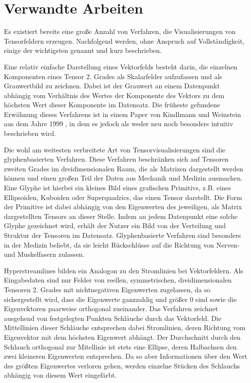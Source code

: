 \documentclass[a4paper,fontsize=12pt,toc=bib,halfparskip]{scrartcl}
\begin{document}
\section{Verwandte Arbeiten}
\label{sec:Verwandte}
Es existiert bereits eine gro{\ss}e Anzahl von Verfahren, die Visualisierungen von Tensorfeldern erzeugen. Nachfolgend werden, ohne Anspruch auf Vollst\"andigkeit, einige der wichtigsten genannt und kurz beschrieben.

Eine relativ einfache Darstellung eines Vektorfelds besteht darin, die einzelnen Komponenten eines Tensor 2. Grades als Skalarfelder aufzufassen und als Grauwertbild zu zeichnen. Dabei ist der Grauwert an einem Datenpunkt abh\"angig vom Verh\"altnis des Wertes der Komponente des Vektors zu dem h\"ochsten Wert dieser Komponente im Datensatz. Die fr\"uheste gefundene Erw\"ahnung dieses Verfahrens ist in einem Paper von Kindlmann und Weinstein aus dem Jahre 1999 \cite{kindlmann1999hue}, in dem es jedoch als weder neu noch besonders intuitiv beschrieben wird. 

Die wohl am weitesten verbreitete Art von Tensorvisualisierungen sind die glyphenbasierten Verfahren. Diese Verfahren beschr\"anken sich auf Tensoren zweiten Grades im dreidimensionalen Raum, die als Matrizen dargestellt werden k\"onnen und einen gro{\ss}en Teil der Daten aus Mechanik und Medizin ausmachen. Eine Glyphe ist hierbei ein kleines Bild eines grafischen Primitivs, z.B. eines Ellipsoiden, Kuboiden oder Superquadrics\cite{kindlmann2004superquadric}, das einen Tensor darstellt. Die Form der Primitive ist dabei abh\"angig von den Eigenwerten des jeweiligen, als Matrix dargestellten Tensors an dieser Stelle. Indem an jedem Datenpunkt eine solche Glyphe gezeichnet wird, erh\"alt der Nutzer ein Bild von der Verteilung und Struktur der Tensoren im Datensatz. Glyphenbasierte Verfahren sind besonders in der Medizin beliebt, da sie leicht R\"uckschl\"usse auf die Richtung von Nerven- und Muskelfasern zulassen.

Hyperstreamlines\cite{delmarcelle1993visualizing} bilden ein Analogon zu den Stromlinien bei Vektorfeldern. Als Eingabedaten sind nur Felder von reellen, symmetrischen, dreidimensionalen Tensoren 2. Grades mit nichtnegativen Eigenwerten zugelassen, da so sichergestellt wird, dass die Eigenwerte ganzzahlig und gr\"o{\ss}er 0 sind sowie die Eigenvektoren paarweise orthogonal zueinander. Das Verfahren zeichnet ausgehend von festgelegten Punkten Schl\"auche durch das Vektorfeld. Die Mittellinien dieser Schl\"auche entsprechen dabei Stromlinien, deren Richtung vom Eigenvektor mit dem h\"ochsten Eigenwert abh\"angt. Der Durchschnitt durch den Schlauch orthogonal zur Mitellinie ist stets eine Ellipse, deren Halbachsen den zwei kleineren Eigenwerten entsprechen. Da so aber Informationen \"uber den Wert des gr\"o{\ss}ten Eigenwertes verloren gehen, werden einzelne St\"ucken des Schlauchs abh\"angig von diesem Wert eingef\"arbt.
\end{document}
